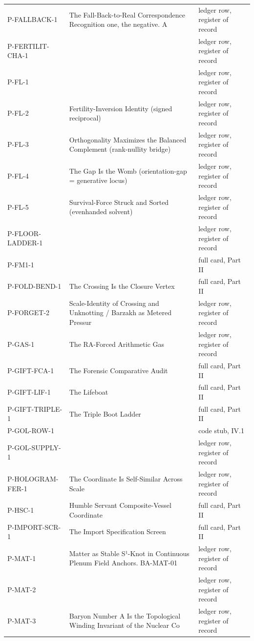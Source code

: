 \documentclass[10pt,twocolumn]{article}
\begin{document}
\begin{center}
\begin{longtable}{>{\raggedright\arraybackslash}p{}>{\raggedright\arraybackslash}p{}>{\raggedright\arraybackslash}p{}}
P-FALLBACK-1 & The Fall-Back-to-Real Correspondence Recognition one, the negative. A & ledger row, register of record \\
P-FERTILIT-CHA-1 &  & ledger row, register of record \\
P-FL-1 &  & ledger row, register of record \\
P-FL-2 & Fertility-Inversion Identity (signed reciprocal) & ledger row, register of record \\
P-FL-3 & Orthogonality Maximizes the Balanced Complement (rank-nullity bridge) & ledger row, register of record \\
P-FL-4 & The Gap Is the Womb (orientation-gap = generative locus) & ledger row, register of record \\
P-FL-5 & Survival-Force Struck and Sorted (evenhanded solvent) & ledger row, register of record \\
P-FLOOR-LADDER-1 &  & ledger row, register of record \\
P-FM1-1 &  & full card, Part II \\
P-FOLD-BEND-1 & The Crossing Is the Closure Vertex & full card, Part II \\
P-FORGET-2 & Scale-Identity of Crossing and Unknotting / Barzakh as Metered Pressur & ledger row, register of record \\
P-GAS-1 & The RA-Forced Arithmetic Gas & ledger row, register of record \\
P-GIFT-FCA-1 & The Forensic Comparative Audit & full card, Part II \\
P-GIFT-LIF-1 & The Lifeboat & full card, Part II \\
P-GIFT-TRIPLE-1 & The Triple Boot Ladder & full card, Part II \\
P-GOL-ROW-1 &  & code stub, IV.1 \\
P-GOL-SUPPLY-1 &  & ledger row, register of record \\
P-HOLOGRAM-FER-1 & The Coordinate Is Self-Similar Across Scale & ledger row, register of record \\
P-HSC-1 & Humble Servant Composite-Vessel Coordinate & full card, Part II \\
P-IMPORT-SCR-1 & The Import Specification Screen & full card, Part II \\
P-MAT-1 & Matter as Stable S¹-Knot in Continuous Plenum Field Anchors. BA-MAT-01 & ledger row, register of record \\
P-MAT-2 &  & ledger row, register of record \\
P-MAT-3 & Baryon Number A Is the Topological Winding Invariant of the Nuclear Co & ledger row, register of record \\

\end{longtable}
\end{center}
\end{document}
